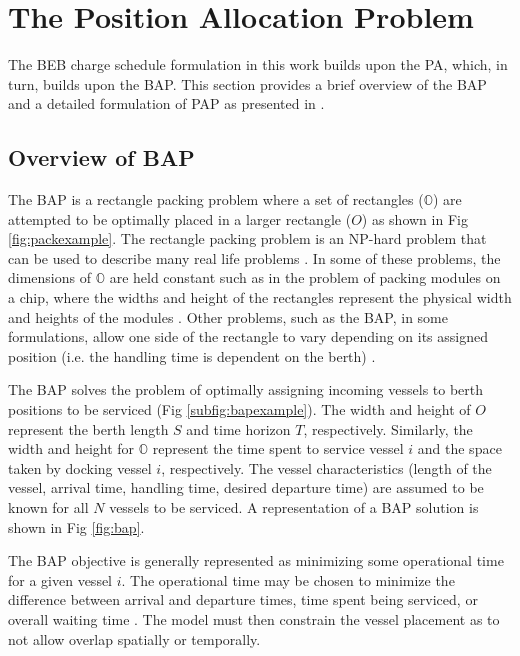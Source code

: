 \documentclass[utf8]{FrontiersinHarvard}
\let\cite\citep                                                                 %
\begin{document}
\section{The Position Allocation Problem}
\label{sec:positionallocationproblem}
The BEB charge schedule formulation in this work builds upon the PA, which, in turn, builds upon the BAP. This section
provides a brief overview of the BAP and a detailed formulation of PAP as presented in \cite{Qarebagh2019}.

\subsection{Overview of BAP}
The BAP is a rectangle packing problem where a set
of rectangles ($\mathbb{O}$) are attempted to be optimally placed in a larger rectangle ($O$) as shown in Fig
\ref{fig:packexample}. The rectangle packing problem is an NP-hard problem that can be used to describe many real life
problems \cite{Bruin2013,Murata1995}. In some of these problems, the dimensions of $\mathbb{O}$ are held constant such
as in the problem of packing modules on a chip, where the widths and height of the rectangles represent the physical
width and heights of the modules \cite{Murata1995}. Other problems, such as the BAP, in some formulations, allow one side of
the rectangle to vary depending on its assigned position (i.e. the handling time is dependent on the berth)
\cite{Buhrkal2010}.

The BAP solves the problem of optimally assigning incoming vessels to berth positions to be serviced (Fig
\ref{subfig:bapexample}). The width and height of $O$ represent the berth length $S$ and time horizon $T$, respectively.
Similarly, the width and height for $\mathbb{O}$ represent the time spent to service vessel $i$ and the space taken by
docking vessel $i$, respectively. The vessel characteristics (length of the vessel, arrival time, handling time, desired
departure time) are assumed to be known for all $N$ vessels to be serviced. A representation of a BAP solution is shown
in Fig \ref{fig:bap}.

The BAP objective is generally represented as minimizing some operational time for a given vessel $i$. The operational
time may be chosen to minimize the difference between arrival and departure times, time spent being serviced, or overall
waiting time \cite{Voss2007, Buhrkal2010,Frojan2015}. The model must then constrain the vessel placement as to not
allow overlap spatially or temporally.
\end{document}
